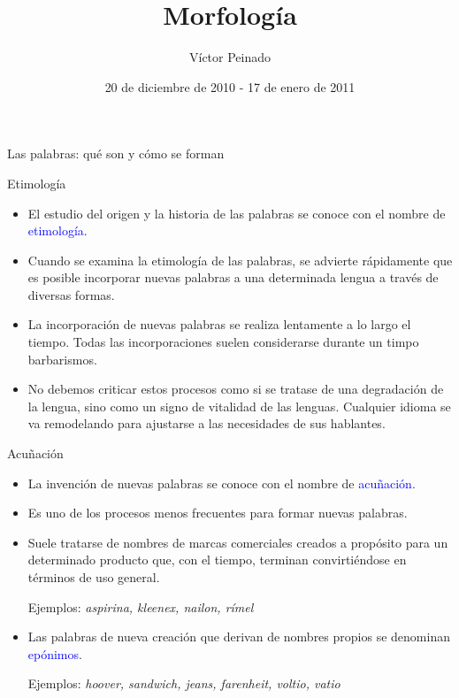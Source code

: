 \documentclass{beamer}
\title[]{Morfología}
\author[V. Peinado]{Víctor Peinado}
\institute[UCM]{
  \texttt{v.peinado@filol.ucm.es}\\[1ex]
  
  Grado de Logopedia, Universidad Complutense de Madrid\\[1ex]
}
\date[Diciembre 2010]{20 de diciembre de 2010 - 17 de enero de 2011}
\begin{document}
\let\ipa\textipa
\let\it\textit


\begin{frame}[plain]
  \titlepage
\end{frame}


\begin{frame}[Parte 1]

\begin{center}
  \LARGE{Las palabras: qué son y cómo se forman}
\end{center} 
\end{frame}


\begin{frame}{Etimología}

\begin{itemize}
    \item El estudio del origen y la historia de las palabras se conoce con el nombre de \textcolor{blue}{etimología}.
    \item Cuando se examina la etimología de las palabras, se advierte rápidamente que es posible incorporar nuevas palabras a una determinada lengua a través de diversas formas. 
    \item La incorporación de nuevas palabras se realiza lentamente a lo largo el tiempo. Todas las incorporaciones suelen considerarse durante un timpo barbarismos.
    \item No debemos criticar estos procesos como si se tratase de una degradación de la lengua, sino como un signo de vitalidad de las lenguas. Cualquier idioma se va remodelando para ajustarse a las necesidades de sus hablantes.
\end{itemize}

\end{frame}


\begin{frame}{Acuñación}

\begin{itemize}
    \item La invención de nuevas palabras se conoce con el nombre de \textcolor{blue}{acuñación}.
    \item Es uno de los procesos menos frecuentes para formar nuevas palabras.
    \item Suele tratarse de nombres de marcas comerciales creados a propósito para un determinado producto que, con el tiempo, terminan convirtiéndose en términos de uso general.
    
    Ejemplos: \it{aspirina, kleenex, nailon, rímel}
    
    \item Las palabras de nueva creación que derivan de nombres propios se denominan \textcolor{blue}{epónimos}.

    Ejemplos: \it{hoover, sandwich, jeans, farenheit, voltio, vatio}
\end{itemize}

\end{frame}
\end{document}

